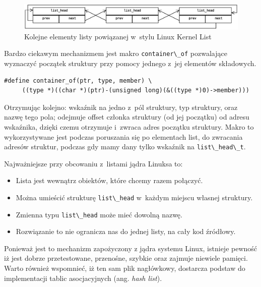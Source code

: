 \documentclass[a4paper,12pt,polish,oneside,openright]{thesis}
\newcommand\code[1]{\lstinline[style=line]{#1}}
\begin{document}
\begin{figure}[htb]
	\begin{center}
		\includegraphics[width=1.05\textwidth]{gfx/list_head.eps}
		\caption{Kolejne elementy listy powiązanej w~stylu Linux Kernel List}
	\end{center}
\end{figure}

Bardzo ciekawym mechanizmem jest makro \code{container\_of} pozwalające wyznaczyć początek struktury przy pomocy jednego z~jej elementów składowych.
\begin{lstlisting}[style=coden,caption=Definicja jednego z makr jądra linuksa: {container\_of}]
#define container_of(ptr, type, member) \
	 ((type *)((char *)(ptr)-(unsigned long)(&((type *)0)->member)))
\end{lstlisting}
Otrzymując kolejno: wskaźnik na jedno z~pól struktury, typ struktury, oraz nazwę tego pola; odejmuje offset członka struktury (od jej początku) od adresu wskaźnika, dzięki czemu otrzymuje i~zwraca adres początku struktury\cite{lkl2}.
Makro to wykorzystywane jest podczas poruszania się po elementach list, do zwracania adresów struktur, podczas gdy mamy dany tylko wskaźnik na \code{list\_head\_t}.

Najważniejsze przy obcowaniu z~listami jądra Linuksa to:
\begin{itemize}
	\item Lista jest wewnątrz obiektów, które chcemy razem połączyć.
	\item Można umieścić strukturę \code{list\_head} w~każdym miejscu własnej struktury.
	\item Zmienna typu \code{list\_head} może mieć dowolną nazwę.
	\item Rozwiązanie to nie ogranicza nas do jednej listy, na cały kod źródłowy.
\end{itemize}
Ponieważ jest to mechanizm zapożyczony z jądra systemu Linux, istnieje pewność iż jest dobrze przetestowane, przenośne, szybkie oraz zajmuje niewiele pamięci.
Warto również wspomnieć, iż ten sam plik nagłówkowy, dostarcza podstaw do implementacji tablic asocjacyjnych (ang. \emph{hash list}).
\end{document}
